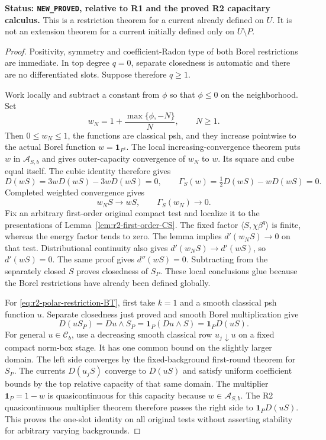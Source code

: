 \documentclass[11pt,a4paper]{article}
\numberwithin{equation}{section}
\theoremstyle{definition}
\theoremstyle{remark}
\newcommand{\Cb}{\mathcal C_b}
\begin{document}
\noindent\textbf{Status: \texttt{NEW\_PROVED}, relative to R1 and the
proved R2 capacitary calculus.}
This is a restriction theorem for a current already defined on
$U$. It is not an extension theorem for a current initially
defined only on $U\setminus P$.

\begin{proof}
Positivity, symmetry and coefficient-Radon type of both Borel
restrictions are immediate. In top degree $q=0$, separate
closedness is automatic and there are no differentiated slots.
Suppose therefore $q\geq1$.

Work locally and subtract a constant from $\phi$ so that
$\phi\leq0$ on the neighborhood. Set
\[
 w_N=1+\frac{\max\{\phi,-N\}}{N},\qquad N\geq1.
\]
Then $0\leq w_N\leq1$, the functions are classical psh, and
they increase pointwise to the actual Borel function
$w=\mathbf1_{P^c}$. The local increasing-convergence theorem
puts $w$ in $\mathcal A_{S,b}$ and gives outer-capacity
convergence of $w_N$ to $w$. Its square and cube equal itself.
The cubic identity therefore gives
\[
 D(wS)=3wD(wS)-3wD(wS)=0,
 \qquad
 \Gamma_S(w)=\tfrac12D(wS)-wD(wS)=0.
\]
Completed weighted convergence gives
\[
 w_NS\longrightarrow wS,
 \qquad \Gamma_S(w_N)\longrightarrow0.
\]
Fix an arbitrary first-order original compact test and localize
it to the presentations of Lemma~\ref{lem:r2-first-order-CS}.
The fixed factor $\langle S,\chi\beta^q\rangle$ is finite,
whereas the energy factor tends to zero. The lemma implies
$d'(w_NS)\to0$ on that test. Distributional continuity also
gives $d'(w_NS)\to d'(wS)$, so $d'(wS)=0$.
The same proof gives $d''(wS)=0$. Subtracting from the separately
closed $S$ proves closedness of $S_P$. These local conclusions
glue because the Borel restrictions have already been defined
globally.

For \eqref{eq:r2-polar-restriction-BT}, first take $k=1$ and
a smooth classical psh function $u$. Separate closedness just
proved and smooth Borel multiplication give
\[
 D(uS_P)=Du\wedge S_P
              =\mathbf1_P(Du\wedge S)=\mathbf1_PD(uS).
\]
For general $u\in\Cb$, use a decreasing smooth classical row
$u_j\downarrow u$ on a fixed compact norm-box stage. It has
one common bound on the slightly larger domain. The left side
converges by the fixed-background first-round theorem for $S_P$.
The currents $D(u_jS)$ converge to $D(uS)$ and satisfy uniform
coefficient bounds by the top relative capacity of that same
domain. The multiplier $\mathbf1_P=1-w$ is quasicontinuous for
this capacity because $w\in\mathcal A_{S,b}$. The R2
quasicontinuous multiplier theorem therefore passes the right
side to $\mathbf1_PD(uS)$. This proves the one-slot identity
on all original tests without asserting stability for arbitrary
varying backgrounds.


\end{proof}
\end{document}
